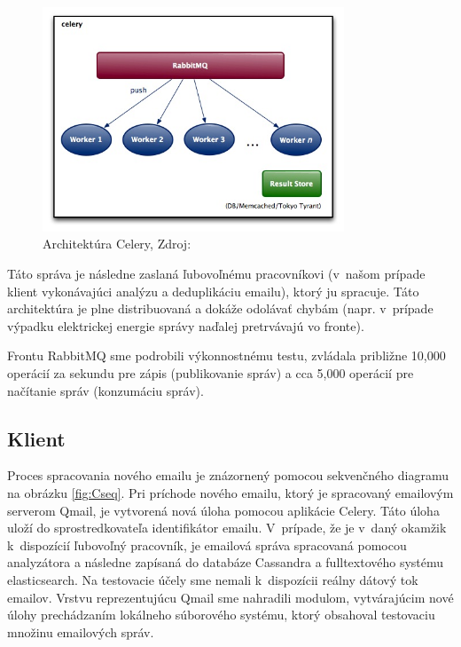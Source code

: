 \documentclass[11pt,twoside,a4paper]{book}
\begin{document}
\begin{figure}[h]
 \centering
 \includegraphics[width=9cm]{./figures/Celery.jpg}
 \caption{Architektúra Celery, Zdroj: \cite{celery}}
 \label{fig:Celery}
\end{figure}
Táto správa je následne zaslaná ľubovoľnému pracovníkovi (v~našom prípade klient vykonávajúci analýzu a deduplikáciu emailu), ktorý ju spracuje. Táto architektúra je plne distribuovaná a dokáže odolávať chybám (napr. v~prípade výpadku elektrickej energie správy naďalej pretrvávajú vo fronte).


Frontu RabbitMQ sme podrobili výkonnostnému testu, zvládala približne 10,000 operácií za sekundu pre zápis (publikovanie správ) a cca 5,000 operácií pre načítanie správ (konzumáciu správ).

\subsection{Klient}

Proces spracovania nového emailu je znázornený pomocou sekvenčného diagramu na obrázku \ref{fig:Cseq}. Pri príchode nového emailu, ktorý je spracovaný emailovým serverom Qmail, je vytvorená nová úloha pomocou aplikácie Celery. Táto úloha uloží do sprostredkovateľa identifikátor emailu. V~prípade, že je v~daný okamžik k~dispozícií ľubovoľný pracovník, je emailová správa spracovaná pomocou analyzátora a následne zapísaná do databáze Cassandra a fulltextového systému elasticsearch. Na testovacie účely sme nemali k~dispozícii reálny dátový tok emailov. Vrstvu reprezentujúcu Qmail sme nahradili modulom, vytvárajúcim nové úlohy prechádzaním lokálneho súborového systému, ktorý obsahoval testovaciu množinu emailových správ.
\end{document}
